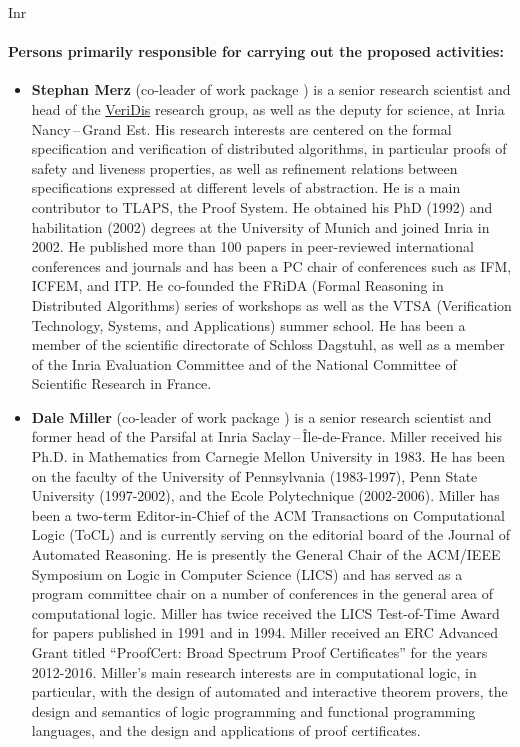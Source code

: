 \begin{sitedescription}{Inr}
\paragraph{Persons primarily responsible for carrying out the proposed activities:}

\begin{itemize} %

\item{\bf Stephan Merz} (co-leader of work package ) is a senior research
scientist and head of the \href{https://team.inria.fr/veridis/}{VeriDis}
research group, as well as the deputy for science, at Inria Nancy\,--\,Grand Est.
His research interests are centered on the formal specification and verification
of distributed algorithms, in particular proofs of safety and liveness
properties, as well as refinement relations between specifications expressed at
different levels of abstraction. He is a main contributor to TLAPS, the \tlaplus
Proof System. He obtained his PhD (1992) and habilitation (2002) degrees at the
University of Munich and joined Inria in 2002. He published more than 100 papers
in peer-reviewed international conferences and journals and has been a PC chair
of conferences such as IFM, ICFEM, and ITP. He co-founded the FRiDA (Formal
Reasoning in Distributed Algorithms) series of workshops as well as the VTSA
(Verification Technology, Systems, and Applications) summer school. He has been
a member of the scientific directorate of Schloss Dagstuhl, as well as a member
of the Inria Evaluation Committee and of the National Committee of Scientific
Research in France.

\item {\bf Dale Miller} (co-leader of work package ) is a senior research scientist
and former head of the Parsifal at Inria Saclay\,--\,\^Ile-de-France.  Miller
received his Ph.D. in Mathematics from Carnegie Mellon University in 1983.  He
has been on the faculty of the University of Pennsylvania (1983-1997), Penn
State University (1997-2002), and the Ecole Polytechnique (2002-2006). Miller
has been a two-term Editor-in-Chief of the ACM Transactions on Computational
Logic (ToCL) and is currently serving on the editorial board of the Journal of
Automated Reasoning. He is presently the General Chair of the ACM/IEEE Symposium
on Logic in Computer Science (LICS) and has served as a program committee chair
on a number of conferences in the general area of computational logic.  Miller
has twice received the LICS Test-of-Time Award for papers published in 1991 and
in 1994.  Miller received an ERC Advanced Grant titled “ProofCert: Broad
Spectrum Proof Certificates” for the years 2012-2016.  Miller's main research
interests are in computational logic, in particular, with the design of
automated and interactive theorem provers, the design and semantics of logic
programming and functional programming languages, and the design and
applications of proof certificates.


\end{itemize}
\end{sitedescription}
